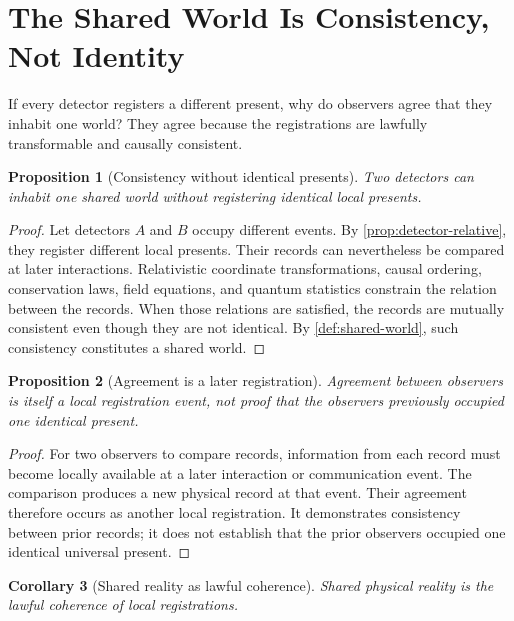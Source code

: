 \documentclass[12pt,onecolumn]{article}
\newtheorem{proposition}{Proposition}[section]
\newtheorem{corollary}[proposition]{Corollary}
\begin{document}
\section{The Shared World Is Consistency, Not Identity}

If every detector registers a different present, why do observers agree that they inhabit one world? They agree because the registrations are lawfully transformable and causally consistent.

\begin{proposition}[Consistency without identical presents]
\label{prop:consistency}
Two detectors can inhabit one shared world without registering identical local presents.
\end{proposition}

\begin{proof}
Let detectors \(A\) and \(B\) occupy different events. By \cref{prop:detector-relative}, they register different local presents. Their records can nevertheless be compared at later interactions. Relativistic coordinate transformations, causal ordering, conservation laws, field equations, and quantum statistics constrain the relation between the records. When those relations are satisfied, the records are mutually consistent even though they are not identical. By \cref{def:shared-world}, such consistency constitutes a shared world.
\end{proof}

\begin{proposition}[Agreement is a later registration]
\label{prop:agreement}
Agreement between observers is itself a local registration event, not proof that the observers previously occupied one identical present.
\end{proposition}

\begin{proof}
For two observers to compare records, information from each record must become locally available at a later interaction or communication event. The comparison produces a new physical record at that event. Their agreement therefore occurs as another local registration. It demonstrates consistency between prior records; it does not establish that the prior observers occupied one identical universal present.
\end{proof}

\begin{corollary}[Shared reality as lawful coherence]
\label{cor:shared-reality}
Shared physical reality is the lawful coherence of local registrations.
\end{corollary}
\end{document}
